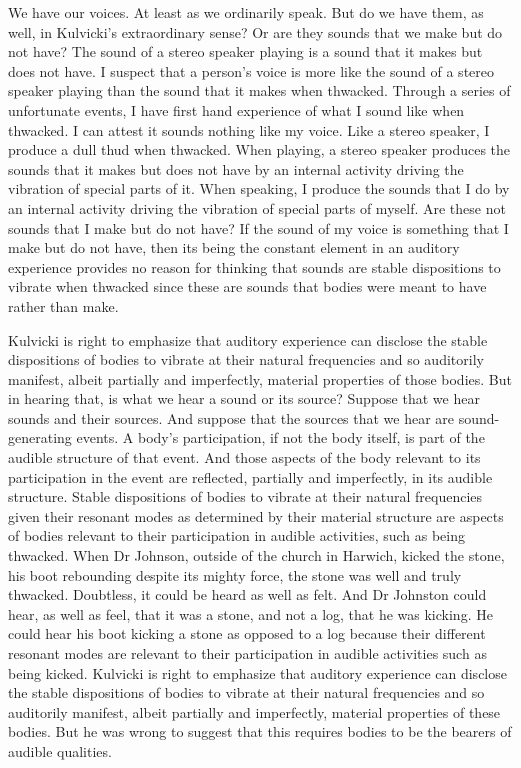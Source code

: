 \documentclass[12pt]{article}
\begin{document}
We have our voices. At least as we ordinarily speak. But do we have them, as well, in Kulvicki’s extraordinary sense? Or are they sounds that we make but do not have? The sound of a stereo speaker playing is a sound that it makes but does not have. I suspect that a person’s voice is more like the sound of a stereo speaker playing than the sound that it makes when thwacked. Through a series of unfortunate events, I have first hand experience of what I sound like when thwacked. I can attest it sounds nothing like my voice. Like a stereo speaker, I produce a dull thud when thwacked. When playing, a stereo speaker produces the sounds that it makes but does not have by an internal activity driving the vibration of special parts of it. When speaking, I produce the sounds that I do by an internal activity driving the vibration of special parts of myself. Are these not sounds that I make but do not have? If the sound of my voice is something that I make but do not have, then its being the constant element in an auditory experience provides no reason for thinking that sounds are stable dispositions to vibrate when thwacked since these are sounds that bodies were meant to have rather than make. 

Kulvicki is right to emphasize that auditory experience can disclose the stable dispositions of bodies to vibrate at their natural frequencies and so auditorily manifest, albeit partially and imperfectly, material properties of those bodies. But in hearing that, is what we hear a sound or its source? Suppose that we hear sounds and their sources. And suppose that the sources that we hear are sound-generating events. A body’s participation, if not the body itself, is part of the audible structure of that event. And those aspects of the body relevant to its participation in the event are reflected, partially and imperfectly, in its audible structure. Stable dispositions of bodies to vibrate at their natural frequencies given their resonant modes as determined by their material structure are aspects of bodies relevant to their participation in audible activities, such as being thwacked. When Dr Johnson, outside of the church in Harwich, kicked the stone, his boot rebounding despite its mighty force, the stone was well and truly thwacked. Doubtless, it could be heard as well as felt. And Dr Johnston could hear, as well as feel, that it was a stone, and not a log, that he was kicking. He could hear his boot kicking a stone as opposed to a log because their different resonant modes are relevant to their participation in audible activities such as being kicked. Kulvicki is right to emphasize that auditory experience can disclose the stable dispositions of bodies to vibrate at their natural frequencies and so auditorily manifest, albeit partially and imperfectly, material properties of these bodies. But he was wrong to suggest that this requires bodies to be the bearers of audible qualities. 
\end{document}
